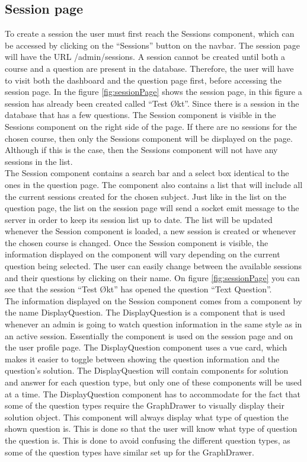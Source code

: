 \subsection{Session page}
To create a session the user must first reach the Sessions component, which can be accessed by clicking on the “Sessions” button on the navbar. The session page will have the URL /admin/sessions. A session cannot be created until both a course and a question are present in the database. Therefore, the user will have to visit both the dashboard and the question page first, before accessing the session page. In the figure \ref{fig:sessionPage} shows the session page, in this figure a session has already been created called “Test Økt”. Since there is a session in the database that has a few questions. The Session component is visible in the Sessions component on the right side of the page. If there are no sessions for the chosen course, then only the Sessions component will be displayed on the page. Although if this is the case, then the Sessions component will not have any sessions in the list.
\\[11pt]
The Session component contains a search bar and a select box identical to the ones in the question page. The component also contains a list that will include all the current sessions created for the chosen subject. Just like in the list on the question page, the list on the session page will send a socket emit message to the server in order to keep its session list up to date. The list will be updated whenever the Session component is loaded, a new session is created or whenever the chosen course is changed. Once the Session component is visible, the information displayed on the component will vary depending on the current question being selected. The user can easily change between the available sessions and their questions by clicking on their name. On figure \ref{fig:sessionPage} you can see that the session “Test Økt” has opened the question “Text Question”. 
\\[11pt]
The information displayed on the Session component comes from a component by the name DisplayQuestion. The DisplayQuestion is a component that is used whenever an admin is going to watch question information in the same style as in an active session. Essentially the component is used on the session page and on the user profile page. The DisplayQuestion component uses a vue card, which makes it easier to toggle between showing the question information and the question's solution.  The DisplayQuestion will contain components for solution and answer for each question type, but only one of these components will be used at a time. The DisplayQuestion component has to accommodate for the fact that some of the question types require the GraphDrawer to visually display their solution object. This component will always display what type of question the shown question is. This is done so that the user will know what type of question the question is. This is done to avoid confusing the different question types, as some of the question types have similar set up for the GraphDrawer.
